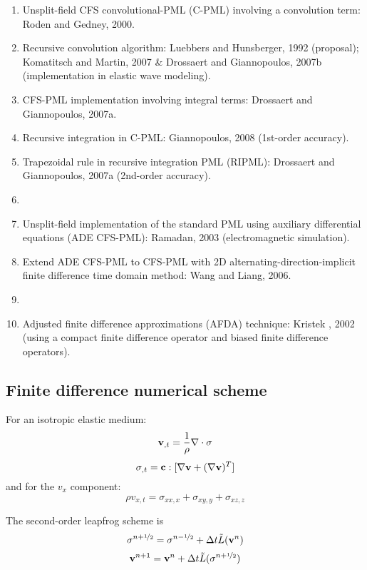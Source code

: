 \begin{enumerate}[\hspace{10mm}*]
  \item Unsplit-field CFS convolutional-PML (C-PML) involving a convolution term: Roden and Gedney, 2000.
  \item Recursive convolution algorithm: Luebbers and Hunsberger, 1992 (proposal); Komatitsch and Martin, 2007 \& Drossaert and Giannopoulos, 2007b (implementation in elastic wave modeling).
  \item CFS-PML implementation involving integral terms: Drossaert and Giannopoulos, 2007a.
  \item Recursive integration in C-PML: Giannopoulos, 2008 (1st-order accuracy).
  \item Trapezoidal rule in recursive integration PML (RIPML): Drossaert and Giannopoulos, 2007a (2nd-order accuracy).
  \item \sline
  \item Unsplit-field implementation of the standard PML using auxiliary differential equations (ADE CFS-PML): Ramadan, 2003 (electromagnetic simulation).
  \item Extend ADE CFS-PML to CFS-PML with 2D alternating-direction-implicit finite difference time domain method: Wang and Liang, 2006.
  \item \sline 
  \item Adjusted finite difference approximations (AFDA) technique: Kristek \etal, 2002 (using a compact finite difference operator and biased finite difference operators).
\end{enumerate}\par
\subsection{Finite difference numerical scheme}
For an isotropic elastic medium:
\[ \mathbf{v}_{,t}=\frac{1}{\rho}\nabla\cdot\mathbf{\sigma} \]
\[ \mathbf{\sigma}_{,t}=\mathbf{c}:[\nabla\mathbf{v}+(\nabla\mathbf{v})^T] \]
and for the $v_x$ component:
\[ \rho v_{x,t}=\sigma_{xx,x}+\sigma_{xy,y}+\sigma_{xz,z} \]\par
The second-order leapfrog scheme is
\[ \mathbf{\sigma}^{n+\nicefrac{1}{2}}=\mathbf{\sigma}^{n-\nicefrac{1}{2}}+\Delta t\tilde{L}(\mathbf{v}^n) \]
\[ \mathbf{v}^{n+1}=\mathbf{v}^n+\Delta t\tilde{L}(\mathbf{\sigma}^{n+\nicefrac{1}{2}}) \]\par
